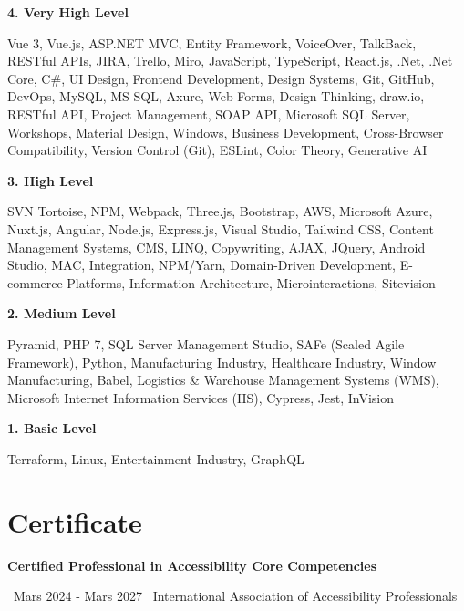 \documentclass[a4paper,10pt]{article}
\newcounter{boxnumber}
\newcommand{\setboxcolor}{%
  \stepcounter{boxnumber}%
  \ifodd\value{boxnumber}
    \def\boxcolor{gray!10}%
  \else
    \def\boxcolor{white}%
  \fi
}
\begin{document}
\textbf{4. Very High Level}

Vue 3, Vue.js, ASP.NET MVC, Entity Framework, VoiceOver, TalkBack, RESTful APIs, JIRA, Trello, Miro, JavaScript, TypeScript, React.js, .Net, .Net Core, C\#, UI Design, Frontend Development, Design Systems, Git, GitHub, DevOps, MySQL, MS SQL, Axure, Web Forms, Design Thinking, draw.io, RESTful API, Project Management, SOAP API, Microsoft SQL Server, Workshops, Material Design, Windows, Business Development, Cross-Browser Compatibility, Version Control (Git), ESLint, Color Theory, Generative AI
\vspace{0.5cm}

\textbf{3. High Level}

SVN Tortoise, NPM, Webpack, Three.js, Bootstrap, AWS, Microsoft Azure, Nuxt.js, Angular, Node.js, Express.js, Visual Studio, Tailwind CSS, Content Management Systems, CMS, LINQ, Copywriting, AJAX, JQuery, Android Studio, MAC, Integration, NPM/Yarn, Domain-Driven Development, E-commerce Platforms, Information Architecture, Microinteractions, Sitevision
\vspace{0.5cm}

\textbf{2. Medium Level}

Pyramid, PHP 7, SQL Server Management Studio, SAFe (Scaled Agile Framework), Python, Manufacturing Industry, Healthcare Industry, Window Manufacturing, Babel, Logistics \& Warehouse Management Systems (WMS), Microsoft Internet Information Services (IIS), Cypress, Jest, InVision
\vspace{0.5cm}

\textbf{1. Basic Level}

Terraform, Linux, Entertainment Industry, GraphQL

\vspace{0.5cm}

\section*{Certificate}

\setboxcolor
\begin{altbox}[\boxcolor]
    \textbf{Certified Professional in Accessibility Core Competencies} \hfill 

    \faCalendar \ Mars 2024 - Mars 2027 \quad \faMapMarker \ International Association of Accessibility Professionals
\end{altbox}
\end{document}
